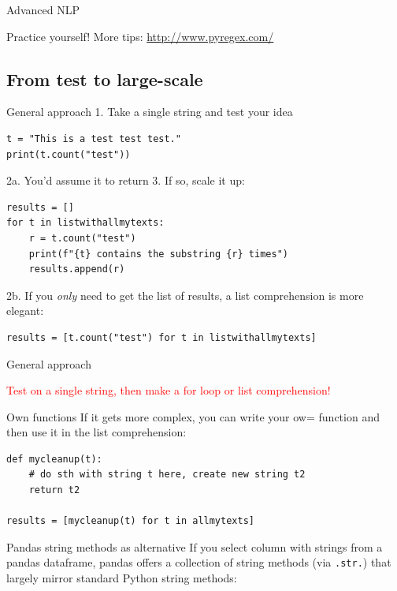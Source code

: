 \documentclass[handout]{beamer}
\begin{document}
\begin{section}{Advanced NLP}
\begin{frame}{Practice yourself!}
More tips:
\huge{\url{http://www.pyregex.com/}}
\end{frame}



\section{From test to large-scale}

\begin{frame}[fragile]{General approach}
1. Take a single string and test your idea
\begin{lstlisting}
t = "This is a test test test."
print(t.count("test"))
\end{lstlisting}
2a. You'd assume it to return 3. If so, scale it up:
\begin{lstlisting}
results = []
for t in listwithallmytexts:
    r = t.count("test")
    print(f"{t} contains the substring {r} times")
    results.append(r)
\end{lstlisting}

2b. If you \emph{only} need to get the list of results, a list comprehension is more elegant:
\begin{lstlisting}
results = [t.count("test") for t in listwithallmytexts]
\end{lstlisting}


\end{frame}


\begin{frame}[fragile]{General approach}
\Large

\textcolor{red}{Test on a single string, then make a for loop or list comprehension!}

\pause

\normalsize

\begin{alertblock}{Own functions}
If it gets more complex, you can write your ow= function and then use it in the list comprehension:
\begin{lstlisting}
def mycleanup(t):
    # do sth with string t here, create new string t2
    return t2

results = [mycleanup(t) for t in allmytexts]
\end{lstlisting}
\end{alertblock}
\end{frame}


\begin{frame}[fragile]{Pandas string methods as alternative}
If you select column with strings from a pandas dataframe, pandas offers a collection of string methods (via \texttt{.str.}) that largely mirror standard Python string methods:


\end{frame}
\end{section}
\end{document}
